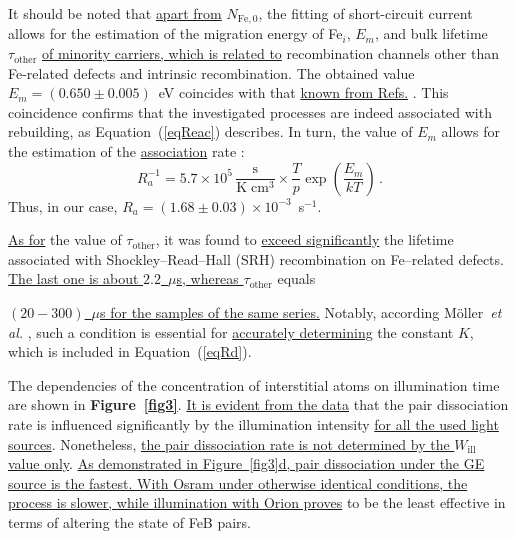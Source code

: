 \documentclass{WileyMSP-template}
\begin{document}
It should be noted that \textcolor[rgb]{0.00,0.07,1.00}{\uline{apart from}} $N_\mathrm{Fe,0}$,
the fitting of short-circuit current \cite{Olikh2022:JMatSci,Olikh2021JAP} allows for the estimation of the migration energy of Fe$_i$, $E_m$,
and bulk lifetime $\tau_\mathrm{other}$ \textcolor[rgb]{0.00,0.07,1.00}{\uline{of minority carriers, which is related to}} recombination channels other than Fe-related defects and intrinsic recombination.
The obtained value $E_m=(0.650\pm0.005)$~eV coincides with that \textcolor[rgb]{0.00,0.07,1.00}{\uline{known from Refs.}} \cite{FeBKin2019,FeBAssSST2011,FeBkinAPL2008}.
This coincidence confirms that the investigated processes are indeed associated with rebuilding,
as Equation~(\ref{eqReac}) describes.
In turn, the value of $E_m$ allows for the estimation of the \textcolor[rgb]{0.00,0.07,1.00}{\uline{association}} rate \cite{FeBAssJAP2014,FeBKin2019,FeBAssSST2011}:
\begin{equation}
\label{eqTass}
R_a^{-1}=5.7\times10^5\,\frac{\mathrm{s}}{\mathrm{K}\;\mathrm{cm}^3}\times\frac{T}{p}\exp\left(\frac{E_m}{kT}\right)\,.
\end{equation}
Thus, in our case, $R_a=(1.68\pm0.03)\times10^{-3}$~s$^{-1}$.

\textcolor[rgb]{0.00,0.07,1.00}{\uline{As for}} the value of $\tau_\mathrm{other}$, it was found to \textcolor[rgb]{0.00,0.07,1.00}{\uline{exceed significantly}} the
lifetime associated with Shockley--Read--Hall (SRH) recombination on Fe--related defects.
\textcolor[rgb]{0.00,0.07,1.00}{\uline{The last one is about $2.2$~$\mu$s, whereas $\tau_\mathrm{other}$} equals}

\textcolor[rgb]{0.00,0.07,1.00}{\uline{  $(20-300)$~$\mu$s for the samples of the same series.}}
Notably, according M\"{o}ller~\emph{et al.} \cite{FeBAssJAP2014},
such a condition is essential for \textcolor[rgb]{0.00,0.07,1.00}{\uline{accurately determining}} the constant $K$, which is included in Equation~(\ref{eqRd}).

The dependencies of the concentration of interstitial atoms on illumination time are shown in \textbf{Figure~\ref{fig3}}.
\textcolor[rgb]{0.00,0.07,1.00}{\uline{It is evident from the data}} that the pair dissociation rate is influenced significantly by the illumination intensity 
\textcolor[rgb]{0.00,0.07,1.00}{\uline{for all the used light sources}}.
Nonetheless, \textcolor[rgb]{0.00,0.07,1.00}{\uline{the pair dissociation rate is not determined by the $W_\mathrm{ill}$ value only}}.
\textcolor[rgb]{0.00,0.07,1.00}{\uline{As demonstrated in Figure~\ref{fig3}d, pair dissociation under the GE source is the fastest.
With Osram under otherwise identical conditions, the process is slower,
while illumination with Orion proves}} to be the least effective in terms of altering the state of FeB pairs.
\end{document}
